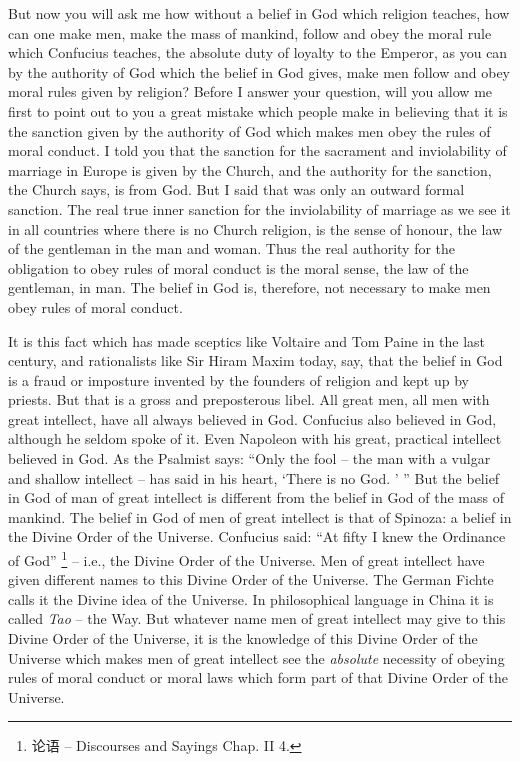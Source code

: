 But now you will ask me how without a belief in God which religion teaches, how can one make men, make the mass of mankind, follow and obey the moral rule which Confucius teaches, the absolute duty of loyalty to the Emperor, as you can by the authority of God which the belief in God gives, make men follow and obey moral rules given by religion? Before I answer your question, will you allow me first to point out to you a great mistake which people make in believing that it is the sanction given by the authority of God which makes men obey the rules of moral conduct. I told you that the sanction for the sacrament and inviolability of marriage in Europe is given by the
Church, and the authority for the sanction, the Church says, is from God. But I said that was only an outward formal sanction. The real true inner sanction for the inviolability of marriage as we see it in all countries where there is no Church religion, is the sense of honour, the law of the gentleman in the man and woman. Thus the real authority for the obligation to obey rules of moral conduct is the moral sense, the law of the gentleman, in man. The belief in God is, therefore, not necessary to make men obey rules of moral conduct.

It is this fact which has made sceptics like Voltaire and Tom Paine in the last century, and rationalists like Sir Hiram Maxim today, say,
that the belief in God is a fraud or imposture invented by the founders of religion and kept up by priests.
But that is a gross and preposterous libel. All great men, all men with great intellect, have all always believed in God.
Confucius also believed in God, although he seldom spoke of it. Even Napoleon with his great, practical intellect believed in God.
As the Psalmist says: ``Only the fool -- the man with a vulgar and shallow intellect -- has said in his heart, `There is no God. ' ''
But the belief in God of man of great intellect is different from the belief in God of the mass of mankind.
The belief in God of men of great intellect is that of Spinoza: a belief in the Divine Order of the Universe.
Confucius said: ``At fifty I knew the Ordinance of God'' \footnote{论语 -- Discourses and Sayings Chap. II 4.}
 -- i.e., the Divine Order of the Universe.
 Men of great intellect have given different names to this Divine Order of the Universe.
 The German Fichte calls it the Divine idea of the Universe. In philosophical language in China it is called \emph{Tao} -- the Way.
But whatever name men of great intellect may give to this Divine Order of the Universe,
it is the knowledge of this Divine Order of the Universe which makes men of great intellect see the \emph{absolute} necessity of obeying rules of moral conduct or moral laws
which form part of that Divine Order of the Universe.

